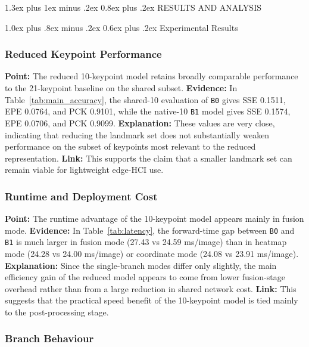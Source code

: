 \documentclass[10pt,letterpaper]{article}
\makeatletter
\renewcommand\section{\@startsection{section}{1}{\z@}%
  {1.3ex plus 1ex minus .2ex}%
  {0.8ex plus .2ex}%
  {\centering\normalfont\small\scshape}}
\renewcommand\subsection{\@startsection{subsection}{2}{\z@}%
  {1.0ex plus .8ex minus .2ex}%
  {0.6ex plus .2ex}%
  {\normalfont\itshape}}
\makeatother
\begin{document}
\section{RESULTS AND ANALYSIS}

\subsection{Experimental Results}

\subsubsection{Reduced Keypoint Performance}

\noindent\textbf{Point:} The reduced 10-keypoint model retains broadly comparable performance to the 21-keypoint baseline on the shared subset.  
\textbf{Evidence:} In Table~\ref{tab:main_accuracy}, the shared-10 evaluation of \texttt{B0} gives SSE 0.1511, EPE 0.0764, and PCK 0.9101, while the native-10 \texttt{B1} model gives SSE 0.1574, EPE 0.0706, and PCK 0.9099.  
\textbf{Explanation:} These values are very close, indicating that reducing the landmark set does not substantially weaken performance on the subset of keypoints most relevant to the reduced representation.  
\textbf{Link:} This supports the claim that a smaller landmark set can remain viable for lightweight edge-HCI use.

\subsubsection{Runtime and Deployment Cost}

\medskip
\noindent\textbf{Point:} The runtime advantage of the 10-keypoint model appears mainly in fusion mode.  
\textbf{Evidence:} In Table~\ref{tab:latency}, the forward-time gap between \texttt{B0} and \texttt{B1} is much larger in fusion mode (27.43 vs 24.59 ms/image) than in heatmap mode (24.28 vs 24.00 ms/image) or coordinate mode (24.08 vs 23.91 ms/image).  
\textbf{Explanation:} Since the single-branch modes differ only slightly, the main efficiency gain of the reduced model appears to come from lower fusion-stage overhead rather than from a large reduction in shared network cost.  
\textbf{Link:} This suggests that the practical speed benefit of the 10-keypoint model is tied mainly to the post-processing stage.

\subsubsection{Branch Behaviour}
\end{document}

